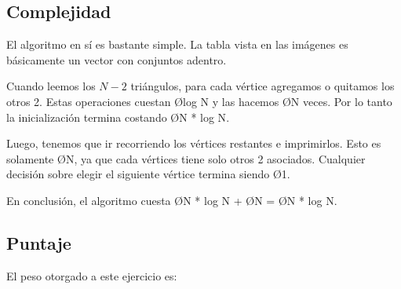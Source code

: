 \subsection{Complejidad}
El algoritmo en sí es bastante simple. La tabla vista en las imágenes es básicamente un vector con conjuntos adentro. 

Cuando leemos los $N - 2$ triángulos, para cada vértice agregamos o quitamos los otros 2. Estas operaciones cuestan \O{log N} y las hacemos \O{N} veces. Por lo tanto la inicialización termina costando \O{N * log N}.

Luego, tenemos que ir recorriendo los vértices restantes e imprimirlos. Esto es solamente \O{N}, ya que cada vértices tiene solo otros 2 asociados. Cualquier decisión sobre elegir el siguiente vértice termina siendo \O{1}.

En conclusión, el algoritmo cuesta \O{N * log N} + \O{N} = \O{N * log N}.

\subsection{Puntaje}
El peso otorgado a este ejercicio es:

